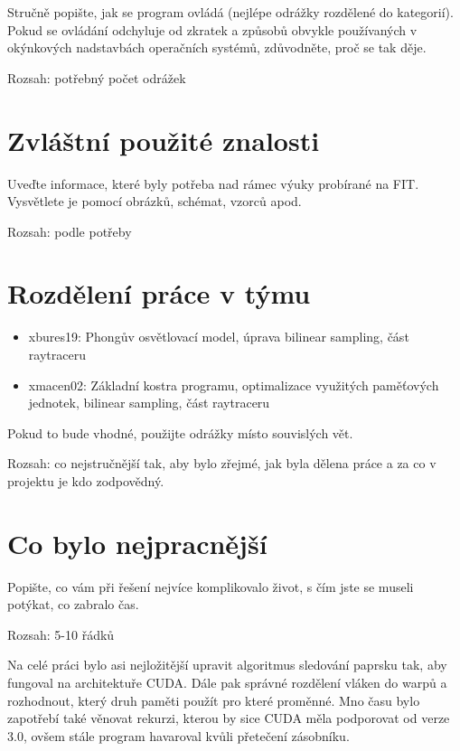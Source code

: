 \documentclass[12pt,a4paper,titlepage,final]{report}
\begin{document}
Stručně popište, jak se program ovládá (nejlépe odrážky rozdělené do
kategorií). Pokud se ovládání odchyluje od zkratek a způsobů obvykle
používaných v okýnkových nadstavbách operačních systémů, zdůvodněte, proč se
tak děje.

Rozsah: potřebný počet odrážek

\section{Zvláštní použité znalosti}

Uveďte informace, které byly potřeba nad rámec výuky probírané na FIT.
Vysvětlete je pomocí obrázků, schémat, vzorců apod. 

Rozsah: podle potřeby 

\section{Rozdělení práce v týmu}

\begin{itemize}
\item xbures19: Phongův osvětlovací model, úprava bilinear sampling, část raytraceru 
\item xmacen02: Základní kostra programu, optimalizace využitých paměťových jednotek, bilinear sampling, část raytraceru 
\end{itemize}
Pokud to bude vhodné, použijte odrážky místo souvislých vět.

Rozsah: co nejstručnější tak, aby bylo zřejmé, jak byla dělena práce a za co v
projektu je kdo zodpovědný.

\section{Co bylo nejpracnější}

Popište, co vám při řešení nejvíce komplikovalo život, s čím jste se museli
potýkat, co zabralo čas.

Rozsah: 5-10 řádků

Na celé práci bylo asi nejložitější upravit algoritmus sledování paprsku tak,
aby fungoval na architektuře CUDA. Dále pak správné rozdělení vláken do warpů 
a rozhodnout, který druh paměti použít pro které proměnné. Mno času bylo zapotřebí  
také věnovat rekurzi, kterou by sice CUDA měla podporovat od verze 3.0,  
ovšem stále program havaroval kvůli přetečení zásobníku.
\end{document}
